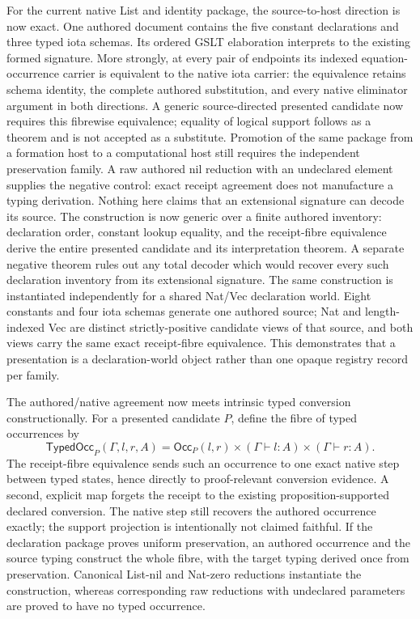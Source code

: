 \documentclass[11pt]{article}
\begin{document}
For the current native List and identity package, the source-to-host direction
is now exact.  One authored document contains the five constant declarations
and three typed iota schemas.  Its ordered GSLT elaboration interprets to the
existing formed signature.  More strongly, at every pair of endpoints its
indexed equation-occurrence carrier is equivalent to the native iota carrier:
the equivalence retains schema identity, the complete authored substitution,
and every native eliminator argument in both directions.  A generic
source-directed presented candidate now requires this fibrewise equivalence;
equality of logical support follows as a theorem and is not accepted as a
substitute.  Promotion of the same package from a formation host to a
computational host still requires the independent preservation family.  A raw
authored nil reduction with an undeclared element supplies the negative
control: exact receipt agreement does not manufacture a typing derivation.
Nothing here claims that an extensional signature can decode its source.
The construction is now generic over a finite authored inventory: declaration
order, constant lookup equality, and the receipt-fibre equivalence derive the
entire presented candidate and its interpretation theorem.  A separate negative
theorem rules out any total decoder which would recover every such declaration
inventory from its extensional signature.
The same construction is instantiated independently for a shared Nat/Vec
declaration world.  Eight constants and four iota schemas generate one authored
source; Nat and length-indexed Vec are distinct strictly-positive candidate
views of that source, and both views carry the same exact receipt-fibre
equivalence.  This demonstrates that a presentation is a declaration-world
object rather than one opaque registry record per family.

The authored/native agreement now meets intrinsic typed conversion
constructionally.  For a presented candidate $P$, define the fibre of typed
occurrences by
\[
  \mathsf{TypedOcc}_{P}(\Gamma,l,r,A)
  = \mathsf{Occ}_{P}(l,r)
    \times (\Gamma \vdash l : A)
    \times (\Gamma \vdash r : A).
\]
The receipt-fibre equivalence sends such an occurrence to one exact native
step between typed states, hence directly to proof-relevant conversion
evidence.  A second, explicit map forgets the receipt to the existing
proposition-supported declared conversion.  The native step still recovers
the authored occurrence exactly; the support projection is intentionally not
claimed faithful.  If the declaration package proves uniform preservation,
an authored occurrence and the source typing construct the whole fibre, with
the target typing derived once from preservation.  Canonical List-nil and
Nat-zero reductions instantiate the construction, whereas corresponding raw
reductions with undeclared parameters are proved to have no typed occurrence.
\end{document}
